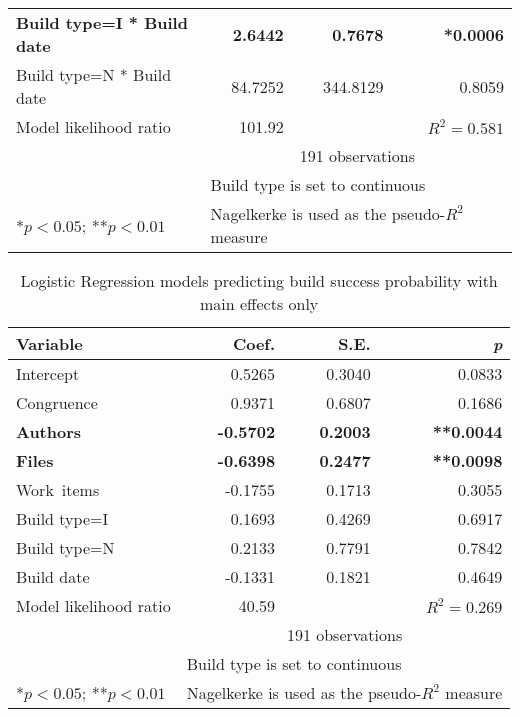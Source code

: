 \begin{table}[t]
\begin{center}
\begin{tabular}{l@{\hspace{15pt}}rrr}
\textbf{Build type=I * Build date}          &   \textbf{2.6442} &   \textbf{0.7678} & \textbf{*0.0006} \\
Build type=N * Build date          &  84.7252 & 344.8129 & 0.8059  \\
	\bottomrule
Model likelihood ratio & 101.92 &  & $R^2=0.581$  \\
& \multicolumn{3}{c}{191 observations}  \\
\multicolumn{1}{l}{ } & \multicolumn{3}{l}{\scriptsize{Build type is set to continuous}} \\
\multicolumn{1}{l}{\scriptsize{*$p < 0.05$; **$p < 0.01$}} & \multicolumn{3}{l}{\scriptsize{Nagelkerke is used as the pseudo-$R^2$ measure}}
\end{tabular}
\end{center}
\label{tab:logr}
\end{table}


\begin{table}[t]
\begin{center}
\caption{Logistic Regression models predicting build success probability with main effects only}
\begin{tabular}{l@{\hspace{15pt}}rr r}
\toprule
Variable & Coef. & S.E. & \emph{p} \\
	\midrule                                                                
	Intercept                &  0.5265 & 0.3040 & 0.0833 \\
	Congruence               &  0.9371 & 0.6807 & 0.1686 \\
	\textbf{Authors}         & \textbf{-0.5702} & \textbf{0.2003} & \textbf{**0.0044}  \\
	\textbf{Files}           & \textbf{-0.6398} & \textbf{0.2477} & \textbf{**0.0098} \\
	Work~items                & -0.1755 & 0.1713 & 0.3055  \\
	Build type=I                   &  0.1693 & 0.4269 & 0.6917  \\
	Build type=N                   &  0.2133 & 0.7791 & 0.7842  \\
	Build date               & -0.1331 & 0.1821 & 0.4649  \\
	\bottomrule
Model likelihood ratio & 40.59 &  & $R^2=0.269$  \\
& \multicolumn{3}{c}{191 observations}  \\
\multicolumn{1}{l}{ } & \multicolumn{3}{l}{\scriptsize{Build type is set to continuous}} \\
\multicolumn{1}{l}{\scriptsize{*$p < 0.05$; **$p < 0.01$}} & \multicolumn{3}{l}{\scriptsize{Nagelkerke is used as the pseudo-$R^2$ measure}}
\end{tabular}
\end{center}
\label{tab:logr_maineffects}
\end{table}

